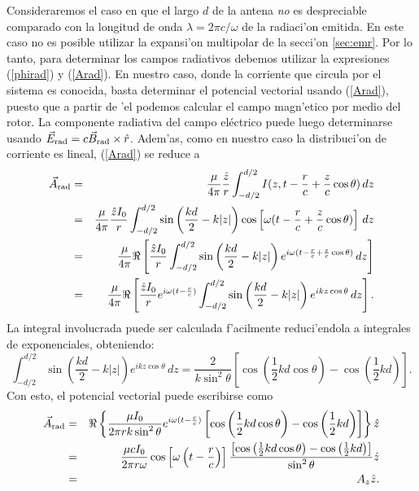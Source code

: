 Consideraremos el caso en que el largo $d$ de la antena \textit{no} es despreciable comparado con la longitud de onda $\lambda=2\pi c/\omega$ de la radiaci'on emitida. En este caso no es posible utilizar la expansi'on multipolar de la secci'on \ref{sec:emr}. Por lo tanto, para determinar los campos radiativos debemos utilizar la expresiones  (\ref{phirad}) y (\ref{Arad}). En nuestro caso, donde la corriente que circula por el sistema es conocida, basta determinar el potencial vectorial usando (\ref{Arad}), puesto que a partir de 'el podemos calcular el campo magn'etico por medio del rotor. La componente radiativa del campo eléctrico puede luego determinarse usando $\vec{E}_{\rm rad}=c\vec{B}_{\rm rad}\times\hat{r}$. Adem'as, como en nuestro caso la distribuci'on de corriente es lineal, (\ref{Arad}) se reduce a
\begin{eqnarray}
 \vec{A}_{\rm rad}&=&\frac{\mu}{4\pi}\frac{\hat{z}}{r}\int_{-d/2}^{d/2}I(z,t-\frac{r}{c}+\frac{z}{c}\cos\theta)\,dz \\
&=&\frac{\mu}{4\pi}\frac{\hat{z}I_0}{r}\int_{-d/2}^{d/2}\sin\left(\frac{kd}{2}-k|z|\right)\cos\left[\omega (t-\frac{r}{c}+\frac{z}{c}\cos\theta)\right]\,dz \\
&=&\frac{\mu}{4\pi}\Re\left[\frac{\hat{z}I_0}{r}\int_{-d/2}^{d/2}\sin\left(\frac{kd}{2}-k|z|\right)e^{i\omega (t-\frac{r}{c}+\frac{z}{c}\cos\theta)}\,dz \right]\\
&=&\frac{\mu}{4\pi}\Re\left[\frac{\hat{z}I_0}{r}e^{i\omega(t-\frac{r}{c})}\int_{-d/2}^{d/2}\sin\left(\frac{kd}{2}-k|z|\right)e^{ikz\cos\theta}\,dz \right] .
\end{eqnarray}
La integral involucrada puede ser calculada f'acilmente reduci'endola a integrales de exponenciales, obteniendo:
\begin{equation}
 \int_{-d/2}^{d/2}\sin\left(\frac{kd}{2}-k|z|\right)e^{ikz\cos\theta}\,dz=\frac{2}{k\sin^2\theta}\left[\cos\left(\frac{1}{2}kd\cos\theta\right)-\cos\left(\frac{1}{2}kd\right)\right] .
\end{equation}
Con esto, el potencial vectorial puede escribirse como
\begin{eqnarray}
 \vec{A}_{\rm rad}&=&
\Re\left\lbrace\frac{\mu I_0}{2\pi rk\sin^2\theta}e^{i\omega(t-\frac{r}{c})}\left[\cos\left(\frac{1}{2}kd\cos\theta\right)-\cos\left(\frac{1}{2}kd\right)\right] \right\rbrace\hat{z}\\
&=&\frac{\mu cI_0}{2\pi r\omega}\cos\left[\omega\left(t-\frac{r}{c}\right)\right]\frac{\left[\cos\left(\frac{1}{2}kd\cos\theta\right)-\cos\left(\frac{1}{2}kd\right)\right]}{\sin^2\theta}\hat{z} \\
&=&A_z\hat{z}.
\end{eqnarray}
